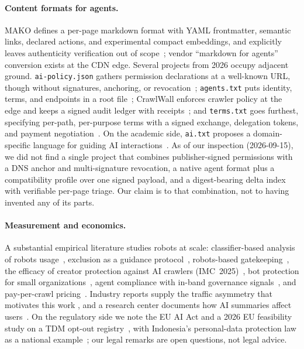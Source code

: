 \documentclass[11pt]{article}
\newcommand{\mako}{MAKO}
\newcommand{\code}[1]{\texttt{#1}}
\begin{document}
\paragraph{Content formats for agents.}
\mako{} defines a per-page markdown format with YAML frontmatter, semantic links,
declared actions, and experimental compact embeddings, and explicitly leaves authenticity
verification out of scope~\citep{makoSpec}; vendor ``markdown for agents'' conversion
exists at the CDN edge. Several projects from 2026 occupy adjacent ground.
\code{ai-policy.json} gathers permission declarations at a well-known URL, though without
signatures, anchoring, or revocation~\citep{aipolicyjson}; \code{agents.txt} puts identity,
terms, and endpoints in a root file~\citep{agentstxt}; CrawlWall enforces crawler policy at
the edge and keeps a signed audit ledger with receipts~\citep{crawlwall}; and
\code{terms.txt} goes furthest, specifying per-path, per-purpose terms with a signed
exchange, delegation tokens, and payment negotiation~\citep{chowdhury2026}. On the
academic side, \code{ai.txt} proposes a domain-specific language for guiding AI
interactions~\citep{li2025aitxt}. As of our inspection (2026-09-15), we did not find a
single project that combines publisher-signed permissions with a DNS anchor and
multi-signature revocation, a native agent format plus a compatibility profile over one
signed payload, and a digest-bearing delta index with verifiable per-page triage. Our
claim is to that combination, not to having invented any of its parts.

\paragraph{Measurement and economics.}
A substantial empirical literature studies robots at scale: classifier-based analysis of
robots usage~\citep{lee2009}, exclusion as a guidance protocol~\citep{ge2016},
robots-based gatekeeping~\citep{steinacker2025}, the efficacy of creator protection
against AI crawlers (IMC~2025)~\citep{liu2025}, bot protection for small
organizations~\citep{hoetzlein2026}, agent compliance with in-band governance
signals~\citep{munirathinam2026}, and pay-per-crawl pricing~\citep{archer2026}. Industry
reports supply the traffic asymmetry that motivates this work
\citep{cfRadar2025,tollbit,cfCrawlRefer,cfContentIndependence}, and a research center
documents how AI summaries affect users~\citep{pew2025}. On the regulatory side we note
the EU AI Act and a 2026 EU feasibility study on a TDM opt-out
registry~\citep{euAiact,euTdmRegistry}, with Indonesia's personal-data protection law as
a national example~\citep{uuPdp27}; our legal remarks are open questions, not legal
advice.
\end{document}
